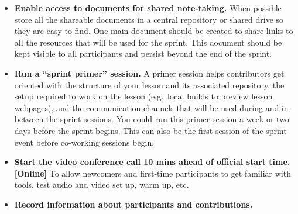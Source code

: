 \documentclass[
]{book}
\begin{document}
\begin{itemize}
\item
  \textbf{Enable access to documents for shared note-taking.}
  When possible store all the shareable documents in a central repository or shared drive so they are easy to find.
  One main document should be created to share links to all the resources that will be used for the sprint.
  This document should be kept visible to all participants and persist beyond the end of the sprint.
\item
  \textbf{Run a ``sprint primer'' session.} A primer session helps contributors get oriented with the structure of your lesson and its associated repository,
  the setup required to work on the lesson
  (e.g.~local builds to preview lesson webpages),
  and the communication channels that will be used during and in-between the sprint sessions.
  You could run this primer session a week or two days before the sprint begins.
  This can also be the first session of the sprint event before co-working sessions begin.
\item
  \textbf{Start the video conference call 10 mins ahead of official start time. {[}Online{]}} To allow newcomers and first-time participants to get familiar with tools, test audio and video set up, warm up, etc.
\item
  \textbf{Record information about participants and contributions.}


\end{itemize}
\end{document}
